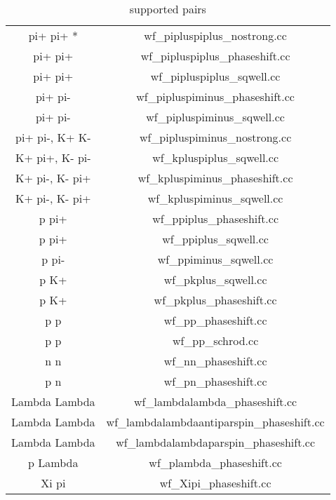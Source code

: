 \documentclass[10pt]{article}
\begin{document}
\begin{table}[htdp]
\caption{supported pairs}
\begin{center}
\begin{tabular}{|c|c|} 
pi+ pi+ *			& wf\_pipluspiplus\_nostrong.cc               \\
pi+ pi+ 			& wf\_pipluspiplus\_phaseshift.cc             \\
pi+ pi+ 			& wf\_pipluspiplus\_sqwell.cc              \\   
pi+ pi- 			& wf\_pipluspiminus\_phaseshift.cc            \\
pi+ pi- 			& wf\_pipluspiminus\_sqwell.cc                \\
pi+ pi-, K+ K- 		& wf\_pipluspiminus\_nostrong.cc             \\
K+ pi+, K- pi-		& wf\_kpluspiplus\_sqwell.cc                  \\
K+ pi-, K- pi+		& wf\_kpluspiminus\_phaseshift.cc            \\ 
K+ pi-, K- pi+ 		& wf\_kpluspiminus\_sqwell.cc                 \\
p pi+ 			& wf\_ppiplus\_phaseshift.cc\\
p pi+ 			& wf\_ppiplus\_sqwell.cc\\
p pi- 				& wf\_ppiminus\_sqwell.cc\\
p K+  			& wf\_pkplus\_sqwell.cc\\
p K+ 			& wf\_pkplus\_phaseshift.cc\\
p p 				& wf\_pp\_phaseshift.cc\\
p p 				& wf\_pp\_schrod.cc\\
n n 				& wf\_nn\_phaseshift.cc            \\           
p n  				& wf\_pn\_phaseshift.cc\\
Lambda Lambda 	& wf\_lambdalambda\_phaseshift.cc             \\
Lambda Lambda 	& wf\_lambdalambdaantiparspin\_phaseshift.cc \\ 
Lambda Lambda 	& wf\_lambdalambdaparspin\_phaseshift.cc     \\ 
p Lambda			& wf\_plambda\_phaseshift.cc\\
Xi pi				& wf\_Xipi\_phaseshift.cc           
\end{tabular}
\end{center}
\label{supported pairs * pi+ pi+ wave function and kernels are used for all identical meson pairs (e.g. K+ K+, pi- pi-, ...); pi0 pi0 correlations are essentially pure Bise-Einstein, so are analytic as are pi+ pi+ or pi- pi- when ignoring Coulomb repulsion.}
\end{table}%
\end{document}
